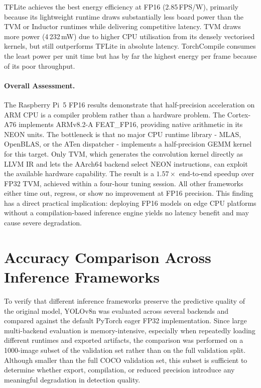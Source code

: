 \documentclass[12pt,a4paper]{report}
\begin{document}
TFLite achieves the best energy efficiency at FP16 (2.85\,FPS/W), primarily
because its lightweight runtime draws substantially less board power than the
TVM or Inductor runtimes while delivering competitive latency. TVM draws more
power (4\,232\,mW) due to higher CPU utilisation from its densely vectorised
kernels, but still outperforms TFLite in absolute latency. TorchCompile consumes
the least power per unit time but has by far the highest energy per frame
because of its poor throughput.

\paragraph{Overall Assessment.}
The Raspberry Pi~5 FP16 results demonstrate that half-precision acceleration
on ARM CPU is a compiler problem rather than a hardware problem. The Cortex-A76
implements ARMv8.2-A FEAT\_FP16, providing native  arithmetic
in its NEON units. The bottleneck is that no major CPU runtime library - MLAS,
OpenBLAS, or the ATen dispatcher - implements a half-precision GEMM kernel for
this target. Only TVM, which generates the convolution kernel directly as LLVM
IR and lets the AArch64 backend select  NEON instructions,
can exploit the available hardware capability. The result is a $1.57\times$
end-to-end speedup over FP32 TVM, achieved within a four-hour tuning session.
All other frameworks either time out, regress, or show no improvement at
FP16 precision. This finding has a direct practical implication: deploying
FP16 models on edge CPU platforms without a compilation-based inference
engine yields no latency benefit and may cause severe degradation.

\section{Accuracy Comparison Across Inference Frameworks}
\label{sec:accuracy_comparison_frameworks}

To verify that different inference frameworks preserve the predictive quality of the original model, YOLOv8n was
evaluated across several backends and compared against the default PyTorch eager FP32 implementation. Since large
multi-backend evaluation is memory-intensive, especially when repeatedly loading different runtimes and exported
artifacts, the comparison was performed on a 1000-image subset of the validation set rather than on the full
validation split. Although smaller than the full COCO validation set, this subset is sufficient to determine whether
export, compilation, or reduced precision introduce any meaningful degradation in detection quality.
\end{document}
